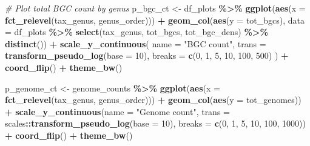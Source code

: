 \documentclass[
]{article}
\newenvironment{Shaded}{\begin{snugshade}}{\end{snugshade}}
\newcommand{\AttributeTok}[1]{\textcolor[rgb]{0.13,0.29,0.53}{#1}}
\newcommand{\CommentTok}[1]{\textcolor[rgb]{0.56,0.35,0.01}{\textit{#1}}}
\newcommand{\DecValTok}[1]{\textcolor[rgb]{0.00,0.00,0.81}{#1}}
\newcommand{\FunctionTok}[1]{\textcolor[rgb]{0.13,0.29,0.53}{\textbf{#1}}}
\newcommand{\NormalTok}[1]{#1}
\newcommand{\OtherTok}[1]{\textcolor[rgb]{0.56,0.35,0.01}{#1}}
\newcommand{\SpecialCharTok}[1]{\textcolor[rgb]{0.81,0.36,0.00}{\textbf{#1}}}
\newcommand{\StringTok}[1]{\textcolor[rgb]{0.31,0.60,0.02}{#1}}
\begin{document}
\begin{Shaded}
\begin{Highlighting}[]
\CommentTok{\# Plot total BGC count by genus}
\NormalTok{p\_bgc\_ct }\OtherTok{\textless{}{-}}\NormalTok{ df\_plots }\SpecialCharTok{\%\textgreater{}\%}
  \FunctionTok{ggplot}\NormalTok{(}\FunctionTok{aes}\NormalTok{(}\AttributeTok{x =} \FunctionTok{fct\_relevel}\NormalTok{(tax\_genus, genus\_order))) }\SpecialCharTok{+}
  \FunctionTok{geom\_col}\NormalTok{(}\FunctionTok{aes}\NormalTok{(}\AttributeTok{y =}\NormalTok{ tot\_bgcs), }\AttributeTok{data =}\NormalTok{ df\_plots }\SpecialCharTok{\%\textgreater{}\%} \FunctionTok{select}\NormalTok{(tax\_genus, tot\_bgcs, tot\_bgc\_dens) }\SpecialCharTok{\%\textgreater{}\%} \FunctionTok{distinct}\NormalTok{()) }\SpecialCharTok{+}
  \FunctionTok{scale\_y\_continuous}\NormalTok{(}
    \AttributeTok{name =} \StringTok{"BGC count"}\NormalTok{,}
    \AttributeTok{trans =} \FunctionTok{transform\_pseudo\_log}\NormalTok{(}\AttributeTok{base =} \DecValTok{10}\NormalTok{),}
    \AttributeTok{breaks =} \FunctionTok{c}\NormalTok{(}\DecValTok{0}\NormalTok{, }\DecValTok{1}\NormalTok{, }\DecValTok{5}\NormalTok{, }\DecValTok{10}\NormalTok{, }\DecValTok{100}\NormalTok{, }\DecValTok{500}\NormalTok{)}
\NormalTok{  ) }\SpecialCharTok{+}
  \FunctionTok{coord\_flip}\NormalTok{() }\SpecialCharTok{+}
  \FunctionTok{theme\_bw}\NormalTok{()}

\NormalTok{p\_genome\_ct }\OtherTok{\textless{}{-}}\NormalTok{ genome\_counts }\SpecialCharTok{\%\textgreater{}\%}
  \FunctionTok{ggplot}\NormalTok{(}\FunctionTok{aes}\NormalTok{(}\AttributeTok{x =} \FunctionTok{fct\_relevel}\NormalTok{(tax\_genus, genus\_order))) }\SpecialCharTok{+}
  \FunctionTok{geom\_col}\NormalTok{(}\FunctionTok{aes}\NormalTok{(}\AttributeTok{y =}\NormalTok{ tot\_genomes)) }\SpecialCharTok{+}
  \FunctionTok{scale\_y\_continuous}\NormalTok{(}\AttributeTok{name =} \StringTok{"Genome count"}\NormalTok{, }\AttributeTok{trans =}\NormalTok{ scales}\SpecialCharTok{::}\FunctionTok{transform\_pseudo\_log}\NormalTok{(}\AttributeTok{base =} \DecValTok{10}\NormalTok{), }\AttributeTok{breaks =} \FunctionTok{c}\NormalTok{(}\DecValTok{0}\NormalTok{, }\DecValTok{1}\NormalTok{, }\DecValTok{5}\NormalTok{, }\DecValTok{10}\NormalTok{, }\DecValTok{100}\NormalTok{, }\DecValTok{1000}\NormalTok{)) }\SpecialCharTok{+}
  \FunctionTok{coord\_flip}\NormalTok{() }\SpecialCharTok{+}
  \FunctionTok{theme\_bw}\NormalTok{()}


\end{Highlighting}
\end{Shaded}
\end{document}
